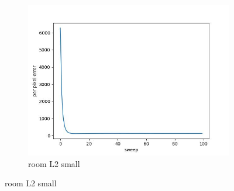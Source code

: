 \documentclass[11pt]{article}
\begin{document}
\begin{figure}[ht!]
\begin{subfigure}[]{0.333\linewidth}
        \includegraphics[width=\linewidth]{fig/loss/room_L2_small_loss.jpg}
        \caption{room L2 small}
    \end{subfigure}%
\end{figure}
\end{document}
